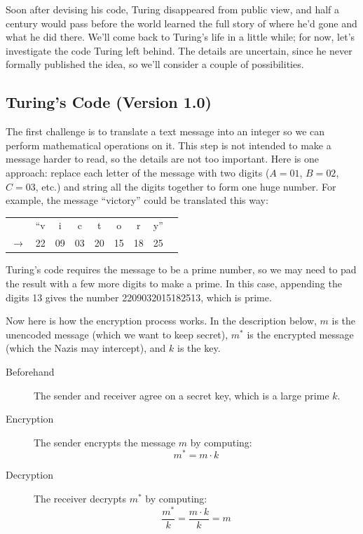 Soon after devising his code, Turing disappeared from public view, and
half a century would pass before the world learned the full story of
where he'd gone and what he did there.  We'll come back to Turing's
life in a little while; for now, let's investigate the code Turing
left behind.  The details are uncertain, since he never formally
published the idea, so we'll consider a couple of possibilities.

\subsection{Turing's Code (Version 1.0)}

The first challenge is to translate a text message into an integer so
we can perform mathematical operations on it.  This step is not
intended to make a message harder to read, so the details are not too
important.  Here is one approach: replace each letter of the message
with two digits ($A = 01$, $B = 02$, $C = 03$, etc.) and string all
the digits together to form one huge number.  For example, the message
``victory'' could be translated this way:
%
\begin{center}
\begin{tabular}{ccccccccc}
   &``v &  i &  c &  t & o & r & y'' \\
$\rightarrow$ & 22 & 09 & 03 & 20 & 15 & 18 & 25
\end{tabular}
\end{center}
%
Turing's code requires the message to be a prime number, so we may
need to pad the result with a few more digits to make a prime.  In
this case, appending the digits 13 gives the number 2209032015182513,
which is prime.

Now here is how the encryption process works.  In the description
below, $m$ is the unencoded message (which we want to keep secret),
$m^*$ is the encrypted message (which the Nazis may intercept), and
$k$ is the key.

\begin{description}

\item[Beforehand] The sender and receiver agree on a secret key, which
is a large prime $k$.

\item[Encryption] The sender encrypts the message $m$ by computing:
\[
m^* = m \cdot k
\]

\item[Decryption] The receiver decrypts $m^*$ by computing:
\[
\frac{m^*}{k} = \frac{m \cdot k}{k} = m
\]

\end{description}

